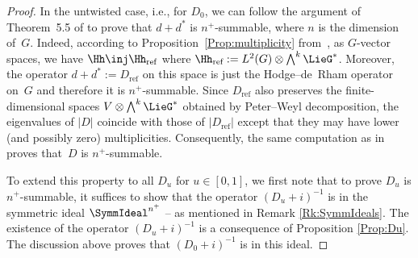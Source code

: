 \begin{proof}
In the untwisted case, i.e., for $D_0$, we can follow the argument of Theorem~5.5 of \cite{TrSpLieGpGG} to prove that $d +d^*$ is $n^+$-summable, where $n$ is the dimension of~$G$. Indeed, according to Proposition~\ref{Prop:multiplicity} from~\cite{ErgodCpctGpHKLS}, as $G$-vector spaces, we have $\Hh \inj \Hh_\text{ref}$ where $\Hh_\text{ref} := L^2(G) \otimes \bigwedge^k \LieG^*$. Moreover, the operator $d +d^* := D_\text{ref}$ on this space is just the Hodge--de~Rham operator on~$G$ and therefore it is $n^+$-summable. Since $D_\text{ref}$ also preserves the f\/inite-dimensional spaces $V \otimes \bigwedge^k \LieG^*$ obtained by Peter--Weyl decomposition, the eigenvalues of $|D|$ coincide with those of $|D_\text{ref}|$ except that they may have lower (and possibly zero) multiplicities. Consequently, the same computation as in~\cite{TrSpLieGpGG} proves that~$D$ is $n^+$-summable.

To extend this property to all $D_u$ for $u \in [0,1]$, we f\/irst note that to prove $D_u$ is $n^+$-summable, it suf\/f\/ices to show that the operator $(D_u + i)^{-1}$ is in the symmetric ideal $\SymmIdeal^{n^+}$ -- as mentioned in Remark \ref{Rk:SymmIdeals}. The existence of the operator $(D_u + i)^{-1}$ is a consequence of Proposition \ref{Prop:Du}. The discussion above proves that $(D_0 + i)^{-1}$ is in this ideal.



\end{proof}
